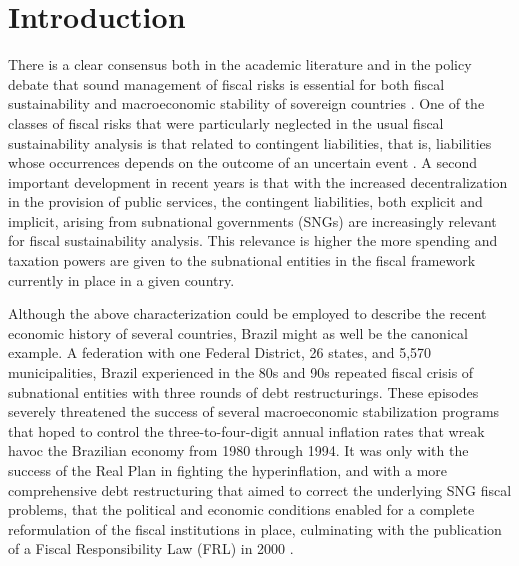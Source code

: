 \chapter{Introduction} 

There is a clear consensus both in the academic literature and in the policy debate that sound management of fiscal risks is essential for both fiscal sustainability and macroeconomic stability of sovereign countries \citep{brixi2002, kopits2014, imf2016}. One of the classes of fiscal risks that were particularly neglected in the usual fiscal sustainability analysis is that related to contingent liabilities, that is, liabilities whose occurrences depends on the outcome of an uncertain event \citep{brixi2002}. A second important development in recent years is that with the increased decentralization in the provision of public services, the contingent liabilities, both explicit and implicit, arising from subnational governments (SNGs) are increasingly relevant for fiscal sustainability analysis. This relevance is higher the more spending and taxation powers are given to the subnational entities in the fiscal framework currently in place in a given country.

Although the above characterization could be employed to describe the recent economic history of several countries, Brazil might as well be the canonical example. A federation with one Federal District, 26 states, and 5,570 municipalities, Brazil experienced in the 80s and 90s repeated fiscal crisis of subnational entities with three rounds of debt restructurings. These episodes severely threatened the success of several macroeconomic stabilization programs that hoped to control the three-to-four-digit annual inflation rates that wreak havoc the Brazilian economy from 1980 through 1994. It was only with the success of the Real Plan in fighting the hyperinflation, and with a more comprehensive debt restructuring that aimed to correct the underlying SNG fiscal problems, that the political and economic conditions enabled for a complete reformulation of the fiscal institutions in place, culminating with the publication of a Fiscal Responsibility Law (FRL) in 2000 \citep[p. 34-35]{manoel2013}. 

